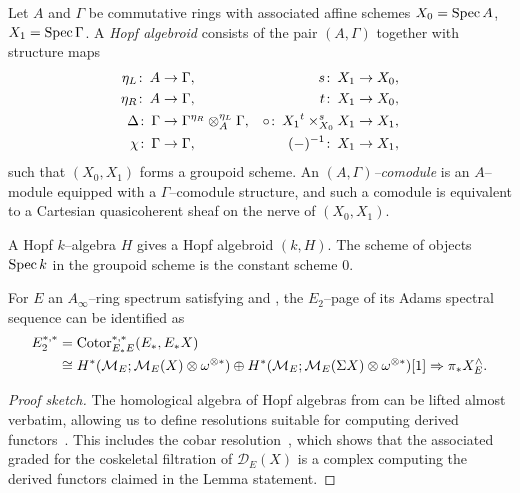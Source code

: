 \begin{definition}\label{FHGivesComodules}
Let $A$ and $\Gamma$ be commutative rings with associated affine schemes $X_0 = \operatorname{Spec} A$, $X_1 = \operatorname{Spec} \Gamma$.  A \textit{Hopf algebroid} consists of the pair $(A, \Gamma)$ together with structure maps
\begin{align*}
\eta_L \colon\thinspace A & \to \Gamma, & s\colon\thinspace X_1 & \to X_0, \\
\eta_R \colon\thinspace A & \to \Gamma, & t\colon\thinspace X_1 & \to X_0, \\
\Delta \colon\thinspace \Gamma & \to \Gamma {}^{\eta_R} \otimes_A^{\eta_L} \Gamma, & \circ\colon\thinspace X_1 {}^{t}\times_{X_0}^{s} X_1 & \to X_1, \\
\chi \colon\thinspace \Gamma & \to \Gamma, & (-)^{-1}\colon\thinspace X_1 & \to X_1,
\end{align*}
such that $(X_0, X_1)$ forms a groupoid scheme.  An \textit{$(A, \Gamma)$--comodule} is an $A$--module equipped with a $\Gamma$--comodule structure, and such a comodule is equivalent to a Cartesian quasicoherent sheaf on the nerve of $(X_0, X_1)$.
\end{definition}

\begin{example}
A Hopf $k$--algebra $H$ gives a Hopf algebroid $(k, H)$.  The scheme of objects $\operatorname{Spec} k$ in the groupoid scheme is the constant scheme $0$.
\end{example}

\begin{lemma}\label{IdentifyingAdamsE2Page}
For $E$ an $A_\infty$--ring spectrum satisfying {\CH} and {\FH}, the $E_2$--page of its Adams spectral sequence can be identified as
\begin{align*}
E_2^{*, *} & = \operatorname{Cotor}_{E_* E}^{*, *}(E_*, E_* X) \\
& \cong H^*(\mathcal{M}_{E}; \mathcal{M}_{E}(X) \otimes \omega^{\otimes *}) \oplus H^*(\mathcal{M}_{E}; \mathcal{M}_{E}(\Sigma X) \otimes \omega^{\otimes *})[1] \Rightarrow \pi_* X^\wedge_E.
\end{align*}
\end{lemma}
\begin{proof}[Proof sketch]
The homological algebra of Hopf algebras from  can be lifted almost verbatim, allowing us to define resolutions suitable for computing derived functors~\cite[Definition A1.2.3]{RavenelGreenBook}.  This includes the cobar resolution~\cite[Definition A1.2.11]{RavenelGreenBook}, which shows that the associated graded for the coskeletal filtration of $\mathcal D_E(X)$ is a complex computing the derived functors claimed in the Lemma statement.
\end{proof}

